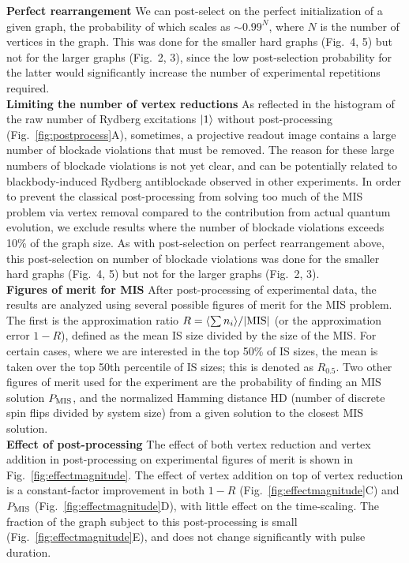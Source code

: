 \documentclass[twocolumn,amssymb,secnumarabic, prl, aps, nofootinbib]{revtex4-1}
\newcommand{\PMIS}{P_\textnormal{MIS}}
\begin{document}
\noindent\textbf{Perfect rearrangement} We can post-select on the perfect initialization of a given graph, the probability of which scales as $\sim 0.99^N$, where $N$ is the number of vertices in the graph. This was done for the smaller hard graphs (Fig.~4, 5) but not for the larger graphs (Fig.~2, 3), since the low post-selection probability for the latter would significantly increase the number of experimental repetitions required.
\\

\noindent\textbf{Limiting the number of vertex reductions}
As reflected in the histogram of the raw number of Rydberg excitations $\ket{1}$ without post-processing (Fig.~\ref{fig:postprocess}A), sometimes, a projective readout image contains a large number of blockade violations that must be removed. The reason for these large numbers of blockade violations is not yet clear, and can be potentially related to blackbody-induced Rydberg antiblockade observed in other experiments. In order to prevent the classical post-processing from solving too much of the MIS problem via vertex removal compared to the contribution from actual quantum evolution, we exclude results where the number of blockade violations exceeds 10\% of the graph size. As with post-selection on perfect rearrangement above, this post-selection on number of blockade violations was done for the smaller hard graphs (Fig.~4, 5) but not for the larger graphs (Fig.~2, 3).\\

\noindent\textbf{Figures of merit for MIS} After post-processing of experimental data, the results are analyzed using several possible figures of merit for the MIS problem. The first is the approximation ratio $R =\langle\sum{n_i}\rangle/|\textnormal{MIS}|$ (or the approximation error $1-R$),
defined as the mean IS size divided by the size of the MIS. For certain cases, where we are interested in the top 50\% of IS sizes, 
the mean is taken over the top 50th percentile of IS sizes; this is denoted as $R_{0.5}$. Two other figures of merit used for the experiment are the probability of finding an MIS solution $\PMIS$, and the normalized Hamming distance HD (number of discrete spin flips divided by system size) from a given solution to the closest MIS solution.\\

\noindent\textbf{Effect of post-processing} The effect of both vertex reduction and vertex addition in post-processing on experimental figures of merit is shown in Fig.~\ref{fig:effectmagnitude}. The effect of vertex addition on top of vertex reduction is a constant-factor improvement in both $1 - R$ (Fig.~\ref{fig:effectmagnitude}C) and $\PMIS$ (Fig.~\ref{fig:effectmagnitude}D), with little effect on the time-scaling. The fraction of the graph subject to this post-processing is small (Fig.~\ref{fig:effectmagnitude}E), and does not change significantly with pulse duration.
\end{document}

